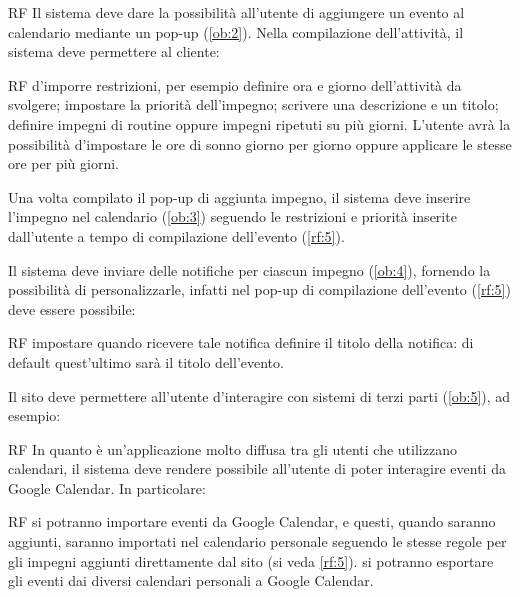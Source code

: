 \begin {listaPersonale}{RF}
Il sistema deve dare la possibilità all'utente di aggiungere un evento al calendario mediante un pop-up (\ref{ob:2}). 
Nella compilazione dell'attività, il sistema deve permettere al cliente: 
\begin{listaPersonale2}{RF}
	 d'imporre restrizioni, per esempio definire ora e giorno dell'attività da svolgere; 
	 impostare la priorità dell'impegno;
	 scrivere una descrizione e un titolo;
	 definire impegni di routine oppure impegni ripetuti su 
	più giorni. 
 L'utente avrà la possibilità d'impostare le ore di sonno giorno per giorno oppure applicare le stesse ore per più giorni.
\end{listaPersonale2}


Una volta compilato il pop-up di aggiunta impegno, il sistema deve inserire l'impegno nel calendario (\ref{ob:3}) seguendo le restrizioni e priorità inserite dall'utente a tempo di compilazione dell'evento (\ref{rf:5}).

Il sistema deve inviare delle notifiche per ciascun impegno (\ref{ob:4}), fornendo la possibilità di 
personalizzarle, infatti nel pop-up di compilazione dell'evento (\ref{rf:5}) deve essere possibile: 
\begin{listaPersonale2}{RF}
	 impostare quando ricevere tale notifica
	 definire il titolo della notifica: di default quest'ultimo sarà il titolo dell'evento.
\end{listaPersonale2}

Il sito deve permettere all'utente d'interagire con sistemi di terzi parti (\ref{ob:5}), ad esempio:

\begin{listaPersonale2}{RF}
In quanto è un'applicazione molto diffusa tra gli utenti che utilizzano calendari,
il sistema deve rendere possibile all'utente di poter interagire eventi da Google Calendar. 
In particolare: 
\begin{listaPersonale3}{RF}
	 si potranno importare eventi da Google Calendar, e questi, quando saranno aggiunti, saranno importati nel calendario personale seguendo le stesse regole per gli impegni aggiunti direttamente dal sito (si veda \ref{rf:5}).
	 si potranno esportare gli eventi dai diversi calendari personali a Google Calendar.
\end{listaPersonale3}


\end{listaPersonale2}
\end{listaPersonale}
